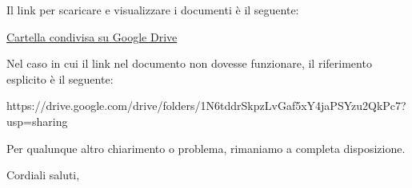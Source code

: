 \documentclass[12pt]{letter}
\begin{document}
\begin{letter}{ }
Il link per scaricare e visualizzare i documenti è il seguente:

\begin{center}
\href{https://drive.google.com/drive/folders/1N6tddrSkpzLvGaf5xY4jaPSYzu2QkPc7?usp=sharing}{Cartella condivisa su Google Drive}
\end{center}

Nel caso in cui il link nel documento non dovesse funzionare, il riferimento esplicito è il seguente:
\begin{center}
https://drive.google.com/drive/folders/1N6tddrSkpzLvGaf5xY4jaPSYzu2QkPc7?usp=sharing
\end{center}


Per qualunque altro chiarimento o problema, rimaniamo a completa disposizione.

\closing{Cordiali saluti,}


\vspace{3em}

\end{letter}
\end{document}
